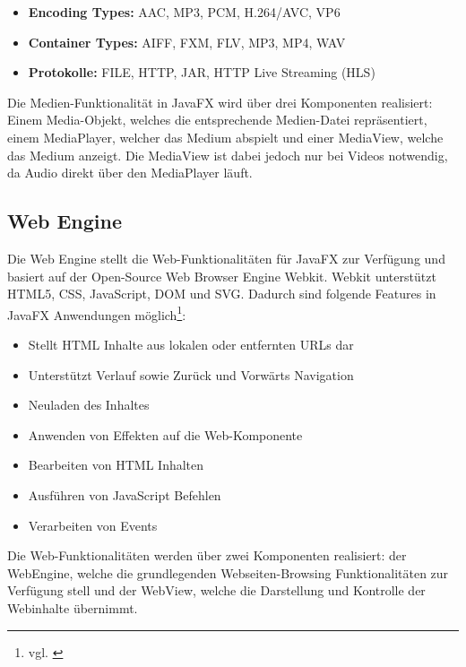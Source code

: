 \begin{itemize}
	\item \textbf{Encoding Types:} AAC, MP3, PCM, H.264/AVC, VP6
	\item \textbf{Container Types:} AIFF, FXM, FLV, MP3, MP4, WAV
	\item \textbf{Protokolle:} FILE, HTTP, JAR, HTTP Live Streaming (HLS)
\end{itemize}

Die Medien-Funktionalität in JavaFX wird über drei Komponenten realisiert: Einem Media-Objekt, welches die entsprechende Medien-Datei repräsentiert, einem MediaPlayer, welcher das Medium abspielt und einer MediaView, welche das Medium anzeigt. Die MediaView ist dabei jedoch nur bei Videos notwendig, da Audio direkt über den MediaPlayer läuft.


\subsection{Web Engine}

Die Web Engine stellt die Web-Funktionalitäten für JavaFX zur Verfügung und basiert auf der Open-Source Web Browser Engine Webkit. Webkit unterstützt HTML5, CSS, JavaScript, DOM und SVG. Dadurch sind folgende Features in JavaFX Anwendungen möglich\footnote{vgl. \cite{javafxarchitecture}}:

\begin{itemize}
	\item Stellt HTML Inhalte aus lokalen oder entfernten URLs dar
	\item Unterstützt Verlauf sowie Zurück und Vorwärts Navigation
	\item Neuladen des Inhaltes
	\item Anwenden von Effekten auf die Web-Komponente
	\item Bearbeiten von HTML Inhalten
	\item Ausführen von JavaScript Befehlen
	\item Verarbeiten von Events
\end{itemize}

Die Web-Funktionalitäten werden über zwei Komponenten realisiert: der WebEngine, welche die grundlegenden Webseiten-Browsing Funktionalitäten zur Verfügung stell und der WebView, welche die Darstellung und Kontrolle der Webinhalte übernimmt.


